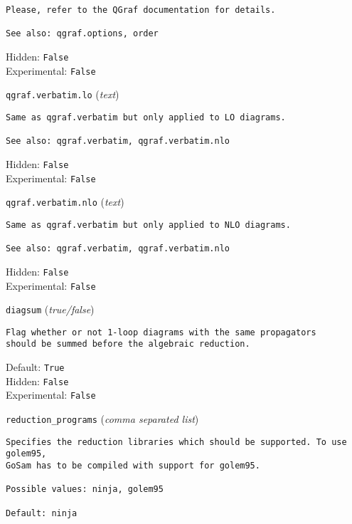 \begin{basedescript}{\desclabelstyle{\pushlabel}}
\begin{verbatim}
Please, refer to the QGraf documentation for details.

See also: qgraf.options, order
\end{verbatim}
Hidden: \verb|False|
\\Experimental: \verb|False|
\\\item[\colorbox{gray!30}{\texttt{qgraf.verbatim.lo}}] (\textit{text})
\begin{verbatim}
Same as qgraf.verbatim but only applied to LO diagrams.

See also: qgraf.verbatim, qgraf.verbatim.nlo
\end{verbatim}
Hidden: \verb|False|
\\Experimental: \verb|False|
\\\item[\colorbox{gray!30}{\texttt{qgraf.verbatim.nlo}}] (\textit{text})
\begin{verbatim}
Same as qgraf.verbatim but only applied to NLO diagrams.

See also: qgraf.verbatim, qgraf.verbatim.nlo
\end{verbatim}
Hidden: \verb|False|
\\Experimental: \verb|False|
\\\item[\colorbox{gray!30}{\texttt{diagsum}}] (\textit{true/false})
\begin{verbatim}
Flag whether or not 1-loop diagrams with the same propagators
should be summed before the algebraic reduction.
\end{verbatim}
Default: \verb|True|
\\Hidden: \verb|False|
\\Experimental: \verb|False|
\\\item[\colorbox{gray!30}{\texttt{reduction\_programs}}] (\textit{comma separated list})
\begin{verbatim}
Specifies the reduction libraries which should be supported. To use golem95,
GoSam has to be compiled with support for golem95.

Possible values: ninja, golem95

Default: ninja


\end{verbatim}
\end{basedescript}
